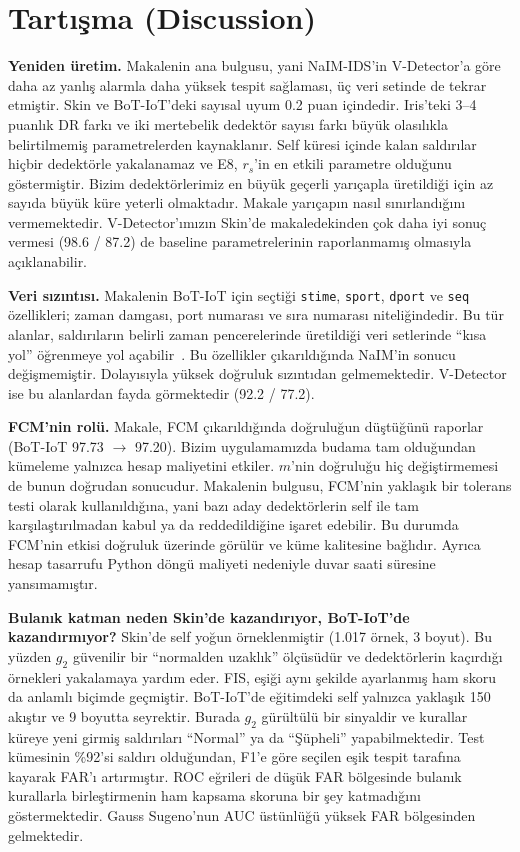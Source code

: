 \documentclass[11pt,a4paper]{article}
\newcommand{\giki}{g_2}
\begin{document}
\section{Tartışma (Discussion)}

\textbf{Yeniden üretim.} Makalenin ana bulgusu, yani NaIM-IDS'in V-Detector'a göre daha az yanlış alarmla daha yüksek tespit sağlaması, üç veri setinde de tekrar etmiştir. Skin ve BoT-IoT'deki sayısal uyum 0.2 puan içindedir. Iris'teki 3--4 puanlık DR farkı ve iki mertebelik dedektör sayısı farkı büyük olasılıkla belirtilmemiş parametrelerden kaynaklanır. Self küresi içinde kalan saldırılar hiçbir dedektörle yakalanamaz ve E8, $r_s$'in en etkili parametre olduğunu göstermiştir. Bizim dedektörlerimiz en büyük geçerli yarıçapla üretildiği için az sayıda büyük küre yeterli olmaktadır. Makale yarıçapın nasıl sınırlandığını vermemektedir. V-Detector'ımızın Skin'de makaledekinden çok daha iyi sonuç vermesi (98.6 / 87.2) de baseline parametrelerinin raporlanmamış olmasıyla açıklanabilir.

\textbf{Veri sızıntısı.} Makalenin BoT-IoT için seçtiği \texttt{stime}, \texttt{sport}, \texttt{dport} ve \texttt{seq} özellikleri; zaman damgası, port numarası ve sıra numarası niteliğindedir. Bu tür alanlar, saldırıların belirli zaman pencerelerinde üretildiği veri setlerinde ``kısa yol'' öğrenmeye yol açabilir~\cite{arp2022}. Bu özellikler çıkarıldığında NaIM'in sonucu değişmemiştir. Dolayısıyla yüksek doğruluk sızıntıdan gelmemektedir. V-Detector ise bu alanlardan fayda görmektedir (92.2 / 77.2).

\textbf{FCM'nin rolü.} Makale, FCM çıkarıldığında doğruluğun düştüğünü raporlar (BoT-IoT 97.73 $\to$ 97.20). Bizim uygulamamızda budama tam olduğundan kümeleme yalnızca hesap maliyetini etkiler. $m$'nin doğruluğu hiç değiştirmemesi de bunun doğrudan sonucudur. Makalenin bulgusu, FCM'nin yaklaşık bir tolerans testi olarak kullanıldığına, yani bazı aday dedektörlerin self ile tam karşılaştırılmadan kabul ya da reddedildiğine işaret edebilir. Bu durumda FCM'nin etkisi doğruluk üzerinde görülür ve küme kalitesine bağlıdır. Ayrıca hesap tasarrufu Python döngü maliyeti nedeniyle duvar saati süresine yansımamıştır.

\textbf{Bulanık katman neden Skin'de kazandırıyor, BoT-IoT'de kazandırmıyor?} Skin'de self yoğun örneklenmiştir (1.017 örnek, 3 boyut). Bu yüzden $\giki$ güvenilir bir ``normalden uzaklık'' ölçüsüdür ve dedektörlerin kaçırdığı örnekleri yakalamaya yardım eder. FIS, eşiği aynı şekilde ayarlanmış ham skoru da anlamlı biçimde geçmiştir. BoT-IoT'de eğitimdeki self yalnızca yaklaşık 150 akıştır ve 9 boyutta seyrektir. Burada $\giki$ gürültülü bir sinyaldir ve kurallar küreye yeni girmiş saldırıları ``Normal'' ya da ``Şüpheli'' yapabilmektedir. Test kümesinin \%92'si saldırı olduğundan, F1'e göre seçilen eşik tespit tarafına kayarak FAR'ı artırmıştır. ROC eğrileri de düşük FAR bölgesinde bulanık kurallarla birleştirmenin ham kapsama skoruna bir şey katmadığını göstermektedir. Gauss Sugeno'nun AUC üstünlüğü yüksek FAR bölgesinden gelmektedir.
\end{document}
